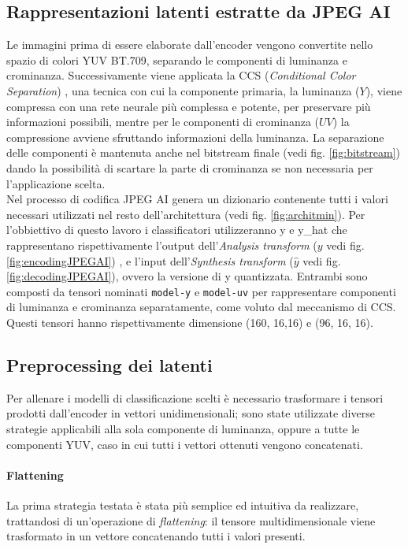 \subsection{Rappresentazioni latenti estratte da JPEG AI}\label{subsec:latenti}
Le immagini prima di essere elaborate dall'encoder vengono convertite nello spazio di colori YUV BT.709, separando le componenti di luminanza e crominanza. Successivamente viene applicata la CCS (\textit{Conditional Color Separation}) \cite{10018070}, una tecnica con cui la componente primaria, la luminanza ($Y$), viene compressa con una rete neurale più complessa e potente, per preservare più informazioni possibili, mentre per le componenti di crominanza ($UV$) la compressione avviene sfruttando informazioni della luminanza.
La separazione delle componenti è mantenuta anche nel bitstream finale (vedi fig. \ref{fig:bitstream}) dando la possibilità di scartare la parte di crominanza se non necessaria per l'applicazione scelta.\\
Nel processo di codifica JPEG AI genera un dizionario contenente tutti i valori necessari utilizzati nel resto dell'architettura (vedi fig. \ref{fig:architmin}). Per l'obbiettivo di questo lavoro i classificatori utilizzeranno y e y\_hat che rappresentano rispettivamente l'output dell'\textit{Analysis transform} ($y$ vedi fig.\ref{fig:encodingJPEGAI}) , e l'input dell'\textit{Synthesis transform} ($\hat{y}$ vedi fig. \ref{fig:decodingJPEGAI}), ovvero la versione di y quantizzata. Entrambi sono composti da tensori nominati \texttt{model-y} e \texttt{model-uv} per rappresentare componenti di luminanza e crominanza separatamente, come voluto dal meccanismo di CCS. Questi tensori hanno rispettivamente dimensione (160, 16,16) e (96, 16, 16).\\
\subsection{Preprocessing dei latenti}\label{sec:preprocessing}
Per allenare i modelli di classificazione scelti è necessario trasformare i tensori prodotti dall'encoder in vettori unidimensionali; sono state utilizzate diverse strategie applicabili alla sola componente di luminanza, oppure a tutte le componenti YUV, caso in cui tutti i vettori ottenuti vengono concatenati.
\paragraph{Flattening} La prima strategia testata è stata più semplice ed intuitiva da realizzare, trattandosi di un'operazione di \textit{flattening}: il tensore multidimensionale viene trasformato in un vettore concatenando tutti i valori presenti.\\
